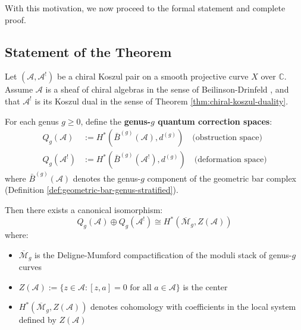 With this motivation, we now proceed to the formal statement and complete proof.

\subsection{Statement of the Theorem}

\begin{theorem}
\label{thm:quantum-complementarity-main}
Let $(\mathcal{A}, \mathcal{A}^!)$ be a chiral Koszul pair on a smooth projective 
curve $X$ over $\mathbb{C}$. Assume $\mathcal{A}$ is a sheaf of chiral algebras in 
the sense of Beilinson-Drinfeld \cite[Chapter 3]{BD04}, and that $\mathcal{A}^!$ is 
its Koszul dual in the sense of Theorem \ref{thm:chiral-koszul-duality}.

For each genus $g \geq 0$, define the \textbf{genus-$g$ quantum correction spaces}:
\begin{align}
Q_g(\mathcal{A}) &:= H^*\left(\bar{B}^{(g)}(\mathcal{A}), d^{(g)}\right) 
\quad \text{(obstruction space)}\\
Q_g(\mathcal{A}^!) &:= H^*\left(\bar{B}^{(g)}(\mathcal{A}^!), d^{(g)}\right) 
\quad \text{(deformation space)}
\end{align}
where $\bar{B}^{(g)}(\mathcal{A})$ denotes the genus-$g$ component of the geometric 
bar complex (Definition \ref{def:geometric-bar-genus-stratified}).

Then there exists a canonical isomorphism:
\begin{equation}
\boxed{Q_g(\mathcal{A}) \oplus Q_g(\mathcal{A}^!) \cong 
H^*(\overline{\mathcal{M}}_g, Z(\mathcal{A}))}
\end{equation}
where:
\begin{itemize}
\item $\overline{\mathcal{M}}_g$ is the Deligne-Mumford compactification of the 
moduli stack of genus-$g$ curves
\item $Z(\mathcal{A}) := \{z \in \mathcal{A} : [z, a] = 0 \text{ for all } a \in 
\mathcal{A}\}$ is the center
\item $H^*(\overline{\mathcal{M}}_g, Z(\mathcal{A}))$ denotes cohomology with 
coefficients in the local system defined by $Z(\mathcal{A})$
\end{itemize}


\end{theorem}
